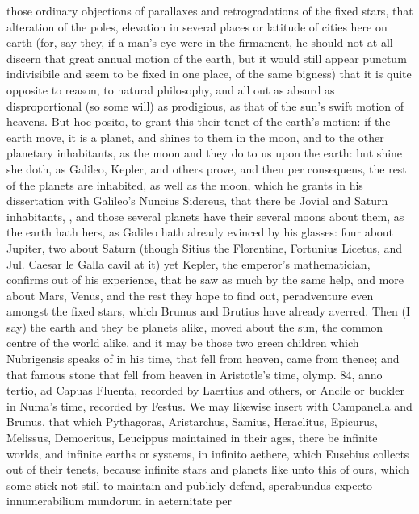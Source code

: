 {those ordinary objections of parallaxes and retrogradations of the
fixed stars, that alteration of the poles, elevation in several places
or latitude of cities here on earth (for, say they, if a man's eye were
in the firmament, he should not at all discern that great annual motion
of the earth, but it would still appear punctum indivisibile and seem
to be fixed in one place, of the same bigness) that it is quite
opposite to reason, to natural philosophy, and all out as absurd as
disproportional (so some will) as prodigious, as that of the sun's
swift motion of heavens. But hoc posito, to grant this their tenet of
the earth's motion: if the earth move, it is a planet, and shines to
them in the moon, and to the other planetary inhabitants, as the moon
and they do to us upon the earth: but shine she doth, as Galileo,
 Kepler, and others prove, and then per consequens, the rest of
the planets are inhabited, as well as the moon, which he grants in his
dissertation with Galileo's Nuncius Sidereus, that there be
Jovial and Saturn inhabitants, \etc{}, and those several planets have
their several moons about them, as the earth hath hers, as Galileo hath
already evinced by his glasses: four about Jupiter, two about
Saturn (though Sitius the Florentine, Fortunius Licetus, and Jul.
Caesar le Galla cavil at it) yet Kepler, the emperor's mathematician,
confirms out of his experience, that he saw as much by the same help,
and more about Mars, Venus, and the rest they hope to find out,
peradventure even amongst the fixed stars, which Brunus and Brutius
have already averred. Then (I say) the earth and they be planets alike,
moved about the sun, the common centre of the world alike, and it may
be those two green children which  Nubrigensis speaks of in his
time, that fell from heaven, came from thence; and that famous stone
that fell from heaven in Aristotle's time, olymp. 84, anno tertio, ad
Capuas Fluenta, recorded by Laertius and others, or Ancile or buckler
in Numa's time, recorded by Festus. We may likewise insert with
Campanella and Brunus, that which Pythagoras, Aristarchus, Samius,
Heraclitus, Epicurus, Melissus, Democritus, Leucippus maintained in
their ages, there be infinite worlds, and infinite earths or
systems, in infinito aethere, which Eusebius collects out of
their tenets, because infinite stars and planets like unto this of
ours, which some stick not still to maintain and publicly defend,
sperabundus expecto innumerabilium mundorum in aeternitate per
}
